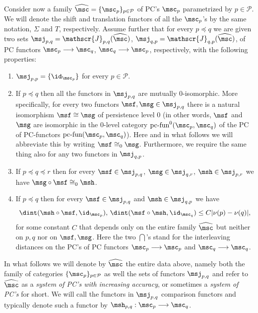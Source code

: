 Consider now a family
$\widehat{\msc} = \{\msc_p\}_{p \in \mathcal{P}}$ of PC's $\msc_p$
parametrized by $p \in \mathcal{P}$. We will denote the shift and
translation functors of all the $\msc_p$'s by the same notation,
$\Sigma$ and $T$, respectively. Assume further that for every
$p \preceq q$ we are given two sets
$\msj_{p,q} = \mathscr{J}_{p,q}(\widehat{\msc})$,
$\msj_{q,p} = \mathscr{J}_{q,p}(\widehat{\msc})$, of PC functors
$\msc_p \longrightarrow \msc_q$, $\msc_q \longrightarrow \msc_p$,
respectively, with the following properties: \label{pp:sys-functors}
\begin{enumerate}
\item $\msj_{p,p} = \{\id_{\msc_p}\}$ for every $p \in \mathcal{P}$.
\item \label{i:0-iso-sys-1} If $p \preceq q$ then all the functors in
  $\msj_{p,q}$ are mutually $0$-isomorphic. More specifically, for
  every two functors $\msf, \msg \in \msj_{p,q}$ there is a natural
  isomorphism $\msf \cong \msg$ of persistence level $0$ (in other
  words, $\msf$ and $\msg$ are isomorphic in the $0$-level category
  $\text{pc-fun}^0(\msc_p, \msc_q)$ of the PC of PC-functors
  $\text{pc-fun}(\msc_p, \msc_q)$). Here and in what follows we will
  abbreviate this by writing $\msf \cong_0 \msg$. Furthermore, we
  require the same thing also for any two functors in $\msj_{q,p}$.
\item \label{i:0-iso-sys-2} If $p \preceq q \preceq r$ then for every
  $\msf \in \msj_{p,q}$, $\msg \in \msj_{q,r}$, $\msh \in \msj_{p,r}$
  we have $\msg \circ \msf \cong_0 \msh$.
\item \label{i:d-int-func} If $p \preceq q$ then for every
  $\msf \in \msj_{p,q}$ and $\msh \in \msj_{q,p}$ we have
  $$\dint(\msh \circ \msf, \id_{\msc_p}), \, \dint(\msf \circ
  \msh, \id_{\msc_q}) \leq C | \nu(p) - \nu(q)|,$$ for some constant
  $C$ that depends only on the entire family $\widehat{\msc}$ but
  neither on $p, q$ nor on $\msf, \msg$. Here the two $\dint$'s
  stand for the interleaving distances on the PC's of PC functors
  $\msc_p \longrightarrow \msc_p$ and $\msc_q \longrightarrow \msc_q$.
\end{enumerate}
In what follows we will denote by $\widehat{\msc}$ the entire data
above, namely both the family of categories
$\{\msc_p\}_{p \in \mathcal{P}}$ as well the sets of functors
$\msj_{p,q}$ and refer to $\widehat{\msc}$ as a {\em system of PC's
  with increasing accuracy}, or sometimes a {\em system of PC's} for
short. We will call the functors in $\msj_{p,q}$ comparison functors
and typically denote such a functor by
$\msh_{p,q}: \msc_p \longrightarrow \msc_q$.


